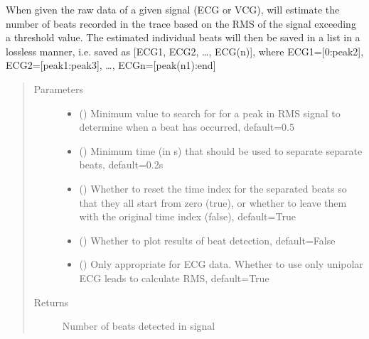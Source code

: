 \documentclass[letterpaper,10pt,english]{sphinxmanual}
\begin{document}
\begin{fulllineitems}
\begin{fulllineitems}
\sphinxAtStartPar
When given the raw data of a given signal (ECG or VCG), will estimate the number of beats recorded in the trace
based on the RMS of the signal exceeding a threshold value. The estimated individual beats will then be saved in
a list in a lossless manner, i.e. saved as {[}ECG1, ECG2, …, ECG(n){]}, where ECG1={[}0:peak2{]}, ECG2={[}peak1:peak3{]},
…, ECGn={[}peak(n\sphinxhyphen{}1):end{]}
\begin{quote}\begin{description}
\item[{Parameters}] \leavevmode\begin{itemize}
\item {} 
\sphinxAtStartPar
{} () \textendash{} Minimum value to search for for a peak in RMS signal to determine when a beat has occurred, default=0.5

\item {} 
\sphinxAtStartPar
{} () \textendash{} Minimum time (in s) that should be used to separate separate beats, default=0.2s

\item {} 
\sphinxAtStartPar
{} () \textendash{} Whether to reset the time index for the separated beats so that they all start from zero (true),
or whether to leave them with the original time index (false), default=True

\item {} 
\sphinxAtStartPar
{} () \textendash{} Whether to plot results of beat detection, default=False

\item {} 
\sphinxAtStartPar
{} (\sphinxstyleliteralemphasis{\sphinxupquote{, }}) \textendash{} Only appropriate for ECG data. Whether to use only unipolar ECG leads to calculate RMS, default=True

\end{itemize}

\item[{Returns}] \leavevmode
\sphinxAtStartPar
{} \textendash{} Number of beats detected in signal


\end{description}
\end{quote}
\end{fulllineitems}
\end{fulllineitems}
\end{document}
